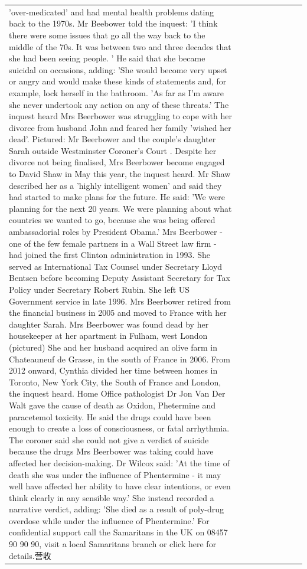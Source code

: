 \begin{table}[H]
\begin{tabular}{lllrlllll}
'over-medicated' and had mental health problems dating back to the 1970s. Mr Beebower told the inquest: 'I think there were some issues that go all the way back to the middle of the 70s. It was between two and three decades that she had been seeing people. ' He said that she became suicidal on occasions, adding: 'She would become very upset or angry and would make these kinds of statements and, for example, lock herself in the bathroom. 'As far as I'm aware she never undertook any action on any of these threats.' The inquest heard Mrs Beerbower was struggling to cope with her divorce from husband John and feared her family 'wished her dead'. Pictured: Mr Beerbower and the couple's daughter Sarah outside Westminster Coroner's Court . Despite her divorce not being finalised, Mrs Beerbower become engaged to David Shaw in May this year, the inquest heard. Mr Shaw described her as a 'highly intelligent women' and said they had started to make plans for the future. He said: 'We were planning for the next 20 years. We were planning about what countries we wanted to go, because she was being offered ambassadorial roles by President Obama.' Mrs Beerbower - one of the few female partners in a Wall Street law firm - had joined the first Clinton administration in 1993. She served as International Tax Counsel under Secretary Lloyd Bentsen before becoming Deputy Assistant Secretary for Tax Policy under Secretary Robert Rubin. She left US Government service in late 1996. Mrs Beerbower retired from the financial business in 2005 and moved to France with her daughter Sarah. Mrs Beerbower was found dead by her housekeeper at her apartment in Fulham, west London (pictured) She and her husband acquired an olive farm in Chateauneuf de Grasse, in the south of France in 2006. From 2012 onward, Cynthia divided her time between homes in Toronto, New York City, the South of France and London, the inquest heard. Home Office pathologist Dr Jon Van Der Walt gave the cause of death as Oxidon, Phetermine and paracetemol toxicity. He said the drugs could have been enough to create a loss of consciousness, or fatal arrhythmia. The coroner said she could not give a verdict of suicide because the drugs Mrs Beerbower was taking could have affected her decision-making. Dr Wilcox said: 'At the time of death she was under the influence of Phentermine - it may well have affected her ability to have clear intentions, or even think clearly in any sensible way.' She instead recorded a narrative verdict, adding: 'She died as a result of poly-drug overdose while under the influence of Phentermine.' For confidential support call the Samaritans in the UK on 08457 90 90 90, visit a local Samaritans branch or click here for details.营收 \\

\end{tabular}
\end{table}
